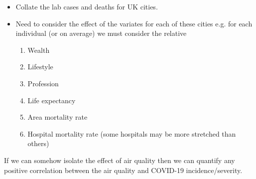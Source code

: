\begin{itemize}
\item Collate the lab cases and deaths for UK cities.
\item Need to consider the effect of the variates for each of these cities e.g. for each individual (or on average) we must consider the relative
\begin{enumerate}
\item Wealth
\item Lifestyle
\item Profession
\item Life expectancy
\item Area mortality rate
\item Hospital mortality rate (some hospitals may be more stretched than others)
\end{enumerate}
\end{itemize}
If we can somehow isolate the effect of air quality then we can quantify any positive correlation between the air quality and COVID-19 incidence/severity.